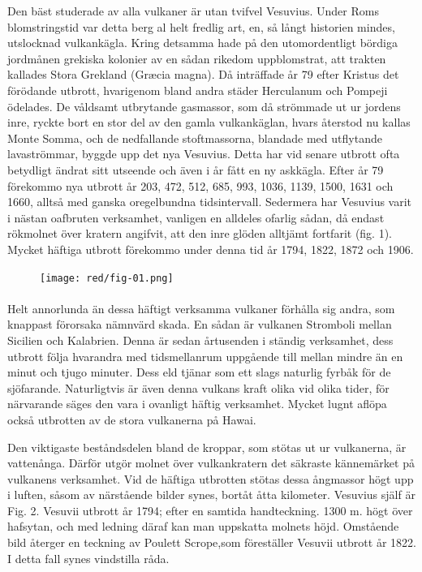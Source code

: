 \documentclass[a4paper, 12pt, oneside, swedish]{article}
\begin{document}
Den bäst studerade av alla vulkaner är utan tvifvel Vesuvius. Under Roms blomstringstid var detta berg al helt fredlig art, en, så långt historien mindes, utslocknad vulkankägla. Kring detsamma hade på den utomordentligt bördiga jordmånen grekiska kolonier av en sådan rikedom uppblomstrat, att trakten kallades Stora Grekland (Græcia magna). Då inträffade år 79 efter Kristus det förödande utbrott, hvarigenom bland andra städer Herculanum och Pompeji ödelades. De våldsamt utbrytande gasmassor, som då strömmade ut ur jordens inre, ryckte bort en stor del av den gamla vulkankäglan, hvars återstod nu kallas Monte Somma, och de nedfallande stoftmassorna, blandade med utflytande lavaströmmar, byggde upp det nya Vesuvius. Detta har vid senare utbrott ofta betydligt ändrat sitt utseende och även i år fått en ny askkägla. Efter år 79 förekommo nya utbrott år 203, 472, 512, 685, 993, 1036, 1139, 1500, 1631 och 1660, alltså med ganska oregelbundna tidsintervall. Sedermera har Vesuvius varit i nästan oafbruten verksamhet, vanligen en alldeles ofarlig sådan, då endast rökmolnet över kratern angifvit, att den inre glöden alltjämt fortfarit (fig. 1). Mycket häftiga utbrott förekommo under denna tid år 1794, 1822, 1872 och 1906.

\begin{figure}[H]
\centering
\texttt{[image: red/fig-01.png]}
\caption{}
\end{figure}
\paragraph{}
Helt annorlunda än dessa häftigt verksamma vulkaner förhålla sig andra, som knappast förorsaka nämnvärd skada. En sådan är vulkanen Stromboli mellan Sicilien och Kalabrien. Denna är sedan årtusenden i ständig verksamhet, dess utbrott följa hvarandra med tidsmellanrum uppgående till mellan mindre än en minut och tjugo minuter. Dess eld tjänar som ett slags naturlig fyrbåk för de sjöfarande. Naturligtvis är även denna vulkans kraft olika vid olika tider, för närvarande säges den vara i ovanligt häftig verksamhet. Mycket lugnt aflöpa också utbrotten av de stora vulkanerna på Hawai.

Den viktigaste beståndsdelen bland de kroppar, som stötas ut ur vulkanerna, är vattenånga. Därför utgör molnet över vulkankratern det säkraste kännemärket på vulkanens verksamhet. Vid de häftiga utbrotten stötas dessa ångmassor högt upp i luften, såsom av närstående bilder synes, bortåt åtta kilometer. Vesuvius själf är Fig. 2. Vesuvii utbrott år 1794; efter en samtida handteckning. 1300 m. högt över hafsytan, och med ledning däraf kan man uppskatta molnets höjd. Omstående bild återger en teckning av Poulett Scrope,som föreställer Vesuvii utbrott år 1822. I detta fall synes vindstilla råda.
\end{document}
